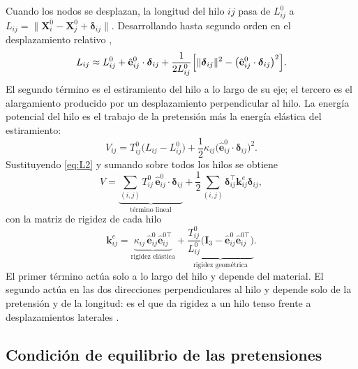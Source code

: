 \documentclass[11pt,letterpaper]{article}
\begin{document}
Cuando los nodos se desplazan, la longitud del hilo $ij$ pasa de $L^0_{ij}$ a
$L_{ij}=\|\mathbf{X}^0_i-\mathbf{X}^0_j+\boldsymbol{\delta}_{ij}\|$.
Desarrollando hasta segundo orden en el desplazamiento relativo
\cite{goldstein2002},
\begin{equation}\label{eq:L2}
    L_{ij}\approx L^0_{ij}
    +\hat{\mathbf{e}}^0_{ij}\cdot\boldsymbol{\delta}_{ij}
    +\frac{1}{2L^0_{ij}}\Bigl[\|\boldsymbol{\delta}_{ij}\|^2
    -\bigl(\hat{\mathbf{e}}^0_{ij}\cdot\boldsymbol{\delta}_{ij}\bigr)^2\Bigr].
\end{equation}
El segundo término es el estiramiento del hilo a lo largo de su eje; el
tercero es el alargamiento producido por un desplazamiento perpendicular al
hilo. La energía potencial del hilo es el trabajo de la pretensión más la
energía elástica del estiramiento:
\begin{equation}\label{eq:Vhilo}
    V_{ij}= T^0_{ij}\bigl(L_{ij}-L^0_{ij}\bigr)
    +\frac12\kappa_{ij}\bigl(\hat{\mathbf{e}}^0_{ij}\cdot\boldsymbol{\delta}_{ij}\bigr)^2 .
\end{equation}
Sustituyendo \eqref{eq:L2} y sumando sobre todos los hilos se obtiene
\begin{equation}\label{eq:V}
    V=\underbrace{\sum_{(i,j)}T^0_{ij}\,\hat{\mathbf{e}}^0_{ij}\cdot\boldsymbol{\delta}_{ij}}_{\text{término lineal}}
    +\frac12\sum_{(i,j)}\boldsymbol{\delta}_{ij}^\top\mathbf{k}^e_{ij}\boldsymbol{\delta}_{ij},
\end{equation}
con la matriz de rigidez de cada hilo
\begin{equation}\label{eq:ke}
    \mathbf{k}^e_{ij}=\underbrace{\kappa_{ij}\,\hat{\mathbf{e}}^0_{ij}\hat{\mathbf{e}}^{0\top}_{ij}}_{\text{rigidez elástica}}
    +\underbrace{\frac{T^0_{ij}}{L^0_{ij}}\bigl(\mathbf{I}_3-\hat{\mathbf{e}}^0_{ij}\hat{\mathbf{e}}^{0\top}_{ij}\bigr)}_{\text{rigidez geométrica}} .
\end{equation}
El primer término actúa solo a lo largo del hilo y depende del material. El
segundo actúa en las dos direcciones perpendiculares al hilo y depende solo
de la pretensión y de la longitud: es el que da rigidez a un hilo tenso
frente a desplazamientos laterales \cite{meirovitch2001}.

\subsection{Condición de equilibrio de las pretensiones}\label{sec:equilibrio}
\end{document}
